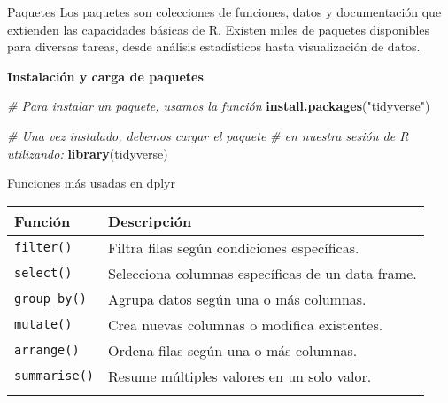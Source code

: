 \documentclass[
  ignorenonframetext,
]{beamer}
\newenvironment{Shaded}{\begin{snugshade}}{\end{snugshade}}
\newcommand{\CommentTok}[1]{\textcolor[rgb]{0.56,0.35,0.01}{\textit{#1}}}
\newcommand{\FunctionTok}[1]{\textcolor[rgb]{0.13,0.29,0.53}{\textbf{#1}}}
\newcommand{\NormalTok}[1]{#1}
\newcommand{\StringTok}[1]{\textcolor[rgb]{0.31,0.60,0.02}{#1}}
\begin{document}
\begin{frame}[fragile]{Paquetes}
\label{paquetes}
Los paquetes son colecciones de funciones, datos y documentación que
extienden las capacidades básicas de R. Existen miles de paquetes
disponibles para diversas tareas, desde análisis estadísticos hasta
visualización de datos.

\textbf{Instalación y carga de paquetes}

\begin{Shaded}
\begin{Highlighting}[]
\CommentTok{\# Para instalar un paquete, usamos la función}
\FunctionTok{install.packages}\NormalTok{(}\StringTok{"tidyverse"}\NormalTok{) }

\CommentTok{\# Una vez instalado, debemos cargar el paquete }
\CommentTok{\# en nuestra sesión de R utilizando:}
\FunctionTok{library}\NormalTok{(tidyverse)}
\end{Highlighting}
\end{Shaded}
\end{frame}

\begin{frame}[fragile]{Funciones más usadas en dplyr}
\label{funciones-muxe1s-usadas-en-dplyr}
\begin{longtable}[]{@{}ll@{}}
\toprule\noalign{}
Función & Descripción \\
\midrule\noalign{}
\endhead
\texttt{filter()} & Filtra filas según condiciones específicas. \\
\texttt{select()} & Selecciona columnas específicas de un data frame. \\
\texttt{group\_by()} & Agrupa datos según una o más columnas. \\
\texttt{mutate()} & Crea nuevas columnas o modifica existentes. \\
\texttt{arrange()} & Ordena filas según una o más columnas. \\
\texttt{summarise()} & Resume múltiples valores en un solo valor. \\
\bottomrule\noalign{}
\end{longtable}
\end{frame}
\end{document}
